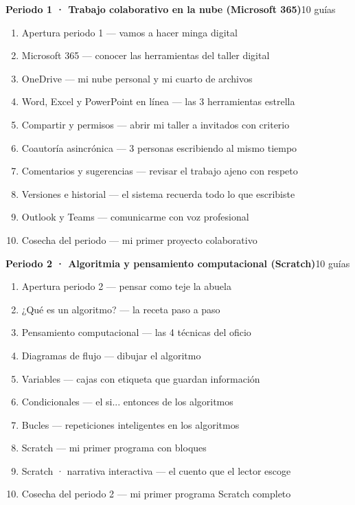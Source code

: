 \bigskip
{}
\vspace{1pt}\par\noindent{\color{vinoInst}\rule{\textwidth}{1pt}}
\vspace{3pt}

\noindent\textbf{Periodo 1 · Trabajo colaborativo en la nube (Microsoft 365)}\hfill{\footnotesize\color{vinoInst}10 guías}\par
\begin{enumerate}[leftmargin=2.6em, itemsep=0.6pt, topsep=2pt, parsep=0pt, label=\footnotesize\arabic*.]
\footnotesize
  \item Apertura periodo 1 --- vamos a hacer minga digital
  \item Microsoft 365 --- conocer las herramientas del taller digital
  \item OneDrive --- mi nube personal y mi cuarto de archivos
  \item Word, Excel y PowerPoint en línea --- las 3 herramientas estrella
  \item Compartir y permisos --- abrir mi taller a invitados con criterio
  \item Coautoría asincrónica --- 3 personas escribiendo al mismo tiempo
  \item Comentarios y sugerencias --- revisar el trabajo ajeno con respeto
  \item Versiones e historial --- el sistema recuerda todo lo que escribiste
  \item Outlook y Teams --- comunicarme con voz profesional
  \item Cosecha del periodo --- mi primer proyecto colaborativo
\end{enumerate}

\noindent\textbf{Periodo 2 · Algoritmia y pensamiento computacional (Scratch)}\hfill{\footnotesize\color{vinoInst}10 guías}\par
\begin{enumerate}[leftmargin=2.6em, itemsep=0.6pt, topsep=2pt, parsep=0pt, label=\footnotesize\arabic*.]
\footnotesize
  \item Apertura periodo 2 --- pensar como teje la abuela
  \item ¿Qué es un algoritmo? --- la receta paso a paso
  \item Pensamiento computacional --- las 4 técnicas del oficio
  \item Diagramas de flujo --- dibujar el algoritmo
  \item Variables --- cajas con etiqueta que guardan información
  \item Condicionales --- el si... entonces de los algoritmos
  \item Bucles --- repeticiones inteligentes en los algoritmos
  \item Scratch --- mi primer programa con bloques
  \item Scratch · narrativa interactiva --- el cuento que el lector escoge
  \item Cosecha del periodo 2 --- mi primer programa Scratch completo
\end{enumerate}

